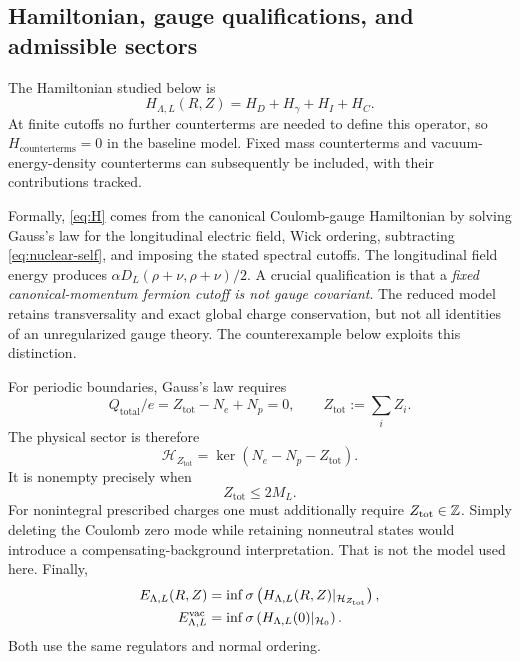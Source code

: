 \subsection{Hamiltonian, gauge qualifications, and admissible sectors}
The Hamiltonian studied below is
\begin{equation}
H_{\Lambda,L}(R,Z)=H_D+H_\gamma+H_I+H_C.
\label{eq:H}
\end{equation}
At finite cutoffs no further counterterms are needed to define this operator,
so \(H_{\mathrm{counterterms}}=0\) in the baseline model. Fixed mass
counterterms and vacuum-energy-density counterterms can subsequently be
included, with their contributions tracked.

Formally, \eqref{eq:H} comes from the canonical Coulomb-gauge Hamiltonian by
solving Gauss's law for the longitudinal electric field, Wick ordering,
subtracting \eqref{eq:nuclear-self}, and imposing the stated spectral cutoffs.
The longitudinal field energy produces
\(\alpha D_L(\rho+\nu,\rho+\nu)/2\).
A crucial qualification is that a \emph{fixed canonical-momentum fermion
cutoff is not gauge covariant}. The reduced model retains transversality and
exact global charge conservation, but not all identities of an unregularized
gauge theory. The counterexample below exploits this distinction.

For periodic boundaries, Gauss's law requires
\begin{equation}
Q_{\mathrm{total}}/e=Z_{\mathrm{tot}}-N_e+N_p=0,\qquad
Z_{\mathrm{tot}}:=\sum_iZ_i.
\label{eq:neutrality}
\end{equation}
The physical sector is therefore
\begin{equation}
\mathcal H_{Z_{\mathrm{tot}}}
=\ker(N_e-N_p-Z_{\mathrm{tot}}).
\end{equation}
It is nonempty precisely when
\begin{equation}
Z_{\mathrm{tot}}\le2M_L.
\label{eq:capacity}
\end{equation}
For nonintegral prescribed charges one must additionally require
\(Z_{\mathrm{tot}}\in\mathbb Z\).
Simply deleting the Coulomb zero mode while retaining nonneutral states
would introduce a compensating-background interpretation. That is not the
model used here. Finally,
\begin{align}
E_{\Lambda,L}(R,Z)
&=\inf\sigma\left(H_{\Lambda,L}(R,Z)|_{\mathcal H_{Z_{\mathrm{tot}}}}\right),\\
E^{\mathrm{vac}}_{\Lambda,L}
&=\inf\sigma\left(H_{\Lambda,L}(0)|_{\mathcal H_0}\right).
\end{align}
Both use the same regulators and normal ordering.

